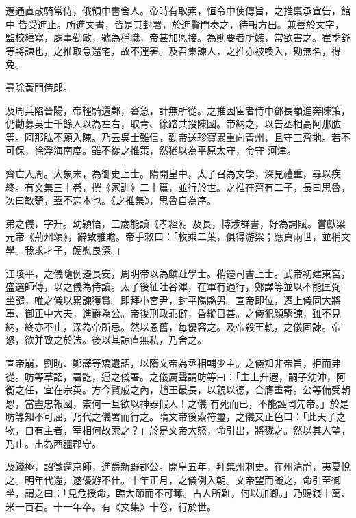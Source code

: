 \begin{pinyinscope}
 遷通直散騎常侍，俄領中書舍人。帝時有取索，恒令中使傳旨，之推稟承宣告，館中
 皆受進止。所進文書，皆是其封署，於進賢門奏之，待報方出。兼善於文字，監校繕寫，處事勤敏，號為稱職，帝甚加恩接。為勛要者所嫉，常欲害之。崔季舒等將諫也，之推取急還宅，故不連署。及召集諫人，之推亦被喚入，勘無名，得免。



 尋除黃門侍郎。



 及周兵陷晉陽，帝輕騎還鄴，窘急，計無所從。之推因宦者侍中鄧長顒進奔陳策，仍勸募吳士千餘人以為左右，取青、徐路共投陳國。帝納之，以告丞相高阿那肱等。阿那肱不願入陳。乃云吳士難信，勸帝送珍寶累重向青州，且守三齊地。若不可保，徐浮海南度。雖不從之推策，然猶以為平原太守，令守
 河津。



 齊亡入周。大象末，為御史上士。隋開皇中，太子召為文學，深見禮重，尋以疾終。有文集三十卷，撰《家訓》二十篇，並行於世。之推在齊有二子，長曰思魯，次曰敏楚，蓋不忘本也。《之推集》，思魯自為序。



 弟之儀，字升。幼穎悟，三歲能讀《孝經》。及長，博涉群書，好為詞賦。嘗獻梁元帝《荊州頌》，辭致雅贍。帝手敕曰：「枚乘二葉，俱得游梁；應貞兩世，並稱文學。我求才子，鯁慰良深。」



 江陵平，之儀隨例遷長安，周明帝以為麟趾學士。稍遷司書上士。武帝初建東宮，盛選師傅，以之儀為侍讀。太子後征吐谷渾，在軍有過行，鄭譯等並以不能匡弼
 坐譴，唯之儀以累諫獲賞。即拜小宮尹，封平陽縣男。宣帝即位，遷上儀同大將軍、御正中大夫，進爵為公。帝後刑政乖僻，昏縱日甚。之儀犯顏驟諫，雖不見納，終亦不止，深為帝所忌。然以恩舊，每優容之。及帝殺王軌，之儀固諫。帝怒，欲并致之於法。後以其諒直無私，乃舍之。



 宣帝崩，劉昉、鄭譯等矯遺詔，以隋文帝為丞相輔少主。之儀知非帝旨，拒而弗從。昉等草詔，署訖，逼之儀署。之儀厲聲謂昉等曰：「主上升遐，嗣子幼沖，阿衡之任，宜在宗英。方今賢戚之內，趙王最長，以親以德，合膺重寄。公等備受朝恩，當盡忠報國，柰何一旦欲以神器假人！之儀
 有死而已，不能誣罔先帝。」於是昉等知不可屈，乃代之儀署而行之。隋文帝後索符璽，之儀又正色曰：「此天子之物，自有主者，宰相何故索之？」於是文帝大怒，命引出，將戮之。然以其人望，乃止。出為西疆郡守。



 及踐極，詔徵還京師，進爵新野郡公。開皇五年，拜集州刺史。在州清靜，夷夏悅之。明年代還，遂優游不仕。十年正月，之儀例入朝。文帝望而識之，命引至御坐，謂之曰：「見危授命，臨大節而不可奪。古人所難，何以加卿。」乃賜錢十萬、米一百石。十一年卒。有《文集》十卷，行於世。




\end{pinyinscope}
